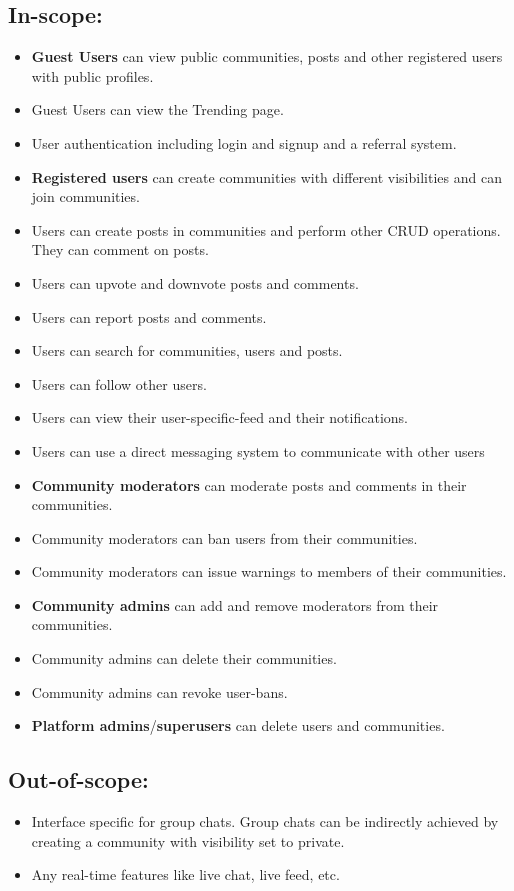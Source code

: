 \documentclass[conference,compsoc]{IEEEtran}
\begin{document}
\subsection*{In-scope:}
\begin{itemize}
    \item \textbf{Guest Users} can view public communities, posts and other registered users with public profiles.
    \item Guest Users can view the Trending page.
    \item User authentication including login and signup and a referral system.
    \item \textbf{Registered users} can create communities with different visibilities and can join communities.
    \item Users can create posts in communities and perform other CRUD operations. They can comment on posts.
    \item Users can upvote and downvote posts and comments.
    \item Users can report posts and comments.
    \item Users can search for communities, users and posts.
    \item Users can follow other users.
    \item Users can view their user-specific-feed and their notifications.
    \item Users can use a direct messaging system to communicate with other users
    \item \textbf{Community moderators} can moderate posts and comments in their communities.
    \item Community moderators can ban users from their communities.
    \item Community moderators can issue warnings to members of their communities.
    \item \textbf{Community admins} can add and remove moderators from their communities.
    \item Community admins can delete their communities.
    \item Community admins can revoke user-bans.
    \item \textbf{Platform admins}/\textbf{superusers} can delete users and communities.
\end{itemize}

\subsection*{Out-of-scope:}
\begin{itemize}
    \item Interface specific for group chats. Group chats can be indirectly achieved by creating a community with visibility set to private.
    \item Any real-time features like live chat, live feed, etc.
\end{itemize}
\end{document}
